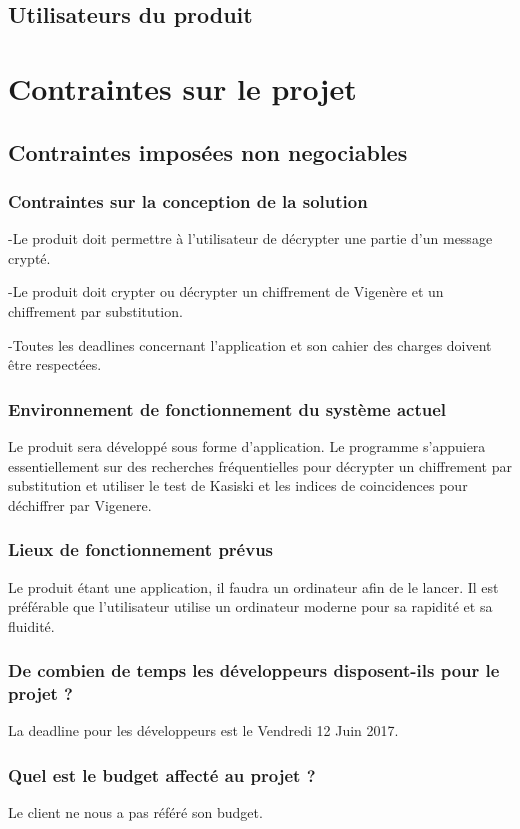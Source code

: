 \documentclass[a4]{article}
\begin{document}
		\subsection{Utilisateurs du produit}
			
	\section{Contraintes sur le projet}
		\subsection{Contraintes imposées non negociables} 
			\subsubsection{Contraintes sur la conception de la solution}
				-Le produit doit permettre à l'utilisateur de décrypter une partie d'un message crypté.

				-Le produit doit crypter ou décrypter un chiffrement de Vigenère et un chiffrement par 					substitution.

				-Toutes les deadlines concernant l'application et son cahier des charges doivent être 					respectées.
			\subsubsection{Environnement de fonctionnement du système actuel}
				Le produit sera développé sous forme d'application. 
				Le programme s'appuiera essentiellement sur des recherches fréquentielles pour décrypter un 					chiffrement par substitution et utiliser le test de Kasiski et les indices de coincidences 					pour déchiffrer par Vigenere.
			\subsubsection{Lieux de fonctionnement prévus}
				Le produit étant une application, il faudra un ordinateur afin de le lancer.
				Il est préférable que l'utilisateur utilise un ordinateur moderne pour sa rapidité et sa 					fluidité.
			\subsubsection{ De combien de temps les développeurs disposent-ils pour le projet ?}
				La deadline pour les développeurs est le Vendredi 12 Juin 2017.
			\subsubsection{ Quel est le budget affecté au projet ?}
				Le client ne nous a pas référé son budget.
\end{document}
